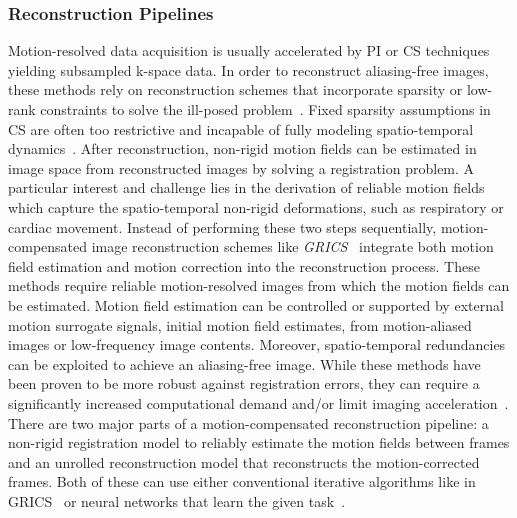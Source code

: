 \documentclass[english,version-2022-01]{uzl-thesis} %
\begin{document}
\subsubsection{Reconstruction Pipelines} \label{SubSubSec:ReconstructionPipelines}
Motion-resolved data acquisition is usually accelerated by PI or CS techniques yielding subsampled k-space data. In order to reconstruct aliasing-free images, these methods rely on reconstruction schemes that incorporate sparsity or low-rank constraints to solve the ill-posed problem~\cite{CS-MRI,ParallelMRI,LowRank+SparseMRI}. Fixed sparsity assumptions in CS are often too restrictive and incapable of fully modeling spatio-temporal dynamics~\cite{Kuestner2022}. 
After reconstruction, non-rigid motion fields can be estimated in image space from reconstructed images by solving a registration problem. A particular interest and challenge lies in the derivation of reliable motion fields which capture the spatio-temporal non-rigid deformations, such as respiratory or cardiac movement. Instead of performing these two steps sequentially, motion-compensated image reconstruction schemes like \emph{GRICS}~\cite{GRICS} integrate both motion field estimation and motion correction into the reconstruction process. These methods require reliable motion-resolved images from which the motion fields can be estimated. Motion field estimation can be controlled or supported by external motion surrogate signals, initial motion field estimates, from motion-aliased images or low-frequency image contents. Moreover, spatio-temporal redundancies can be exploited to achieve an aliasing-free image. While these methods have been proven to be more robust against registration errors, they can require a significantly increased computational demand and/or limit imaging acceleration~\cite{Kuestner2022}.\\
There are two major parts of a motion-compensated reconstruction pipeline: a non-rigid registration model to reliably estimate the motion fields between frames and an unrolled reconstruction model that reconstructs the motion-corrected frames. Both of these can use either conventional iterative algorithms like in GRICS~\cite{GRICS} or neural networks that learn the given task~\cite{Kuestner2022}.
\end{document}
